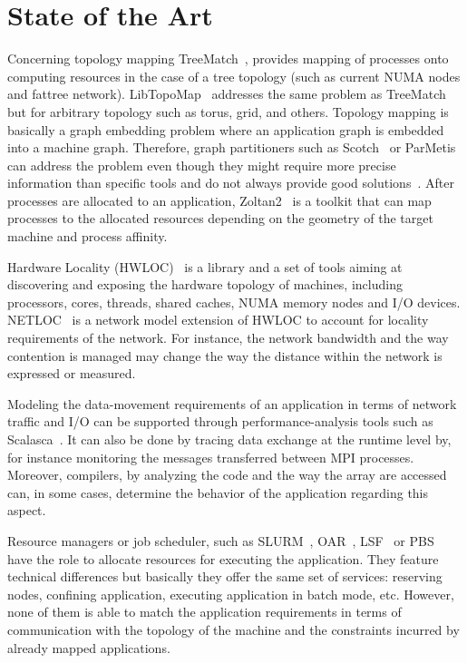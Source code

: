 \section{State of the Art}
Concerning topology mapping TreeMatch~\cite{jmt14b}, provides mapping
of processes onto computing resources in the case of a tree topology (such as
current NUMA nodes and fattree
network). LibTopoMap~\cite{DBLP:conf/ics/HoeflerS11} addresses the same problem as
TreeMatch but for arbitrary topology such as torus, grid, and others. Topology mapping is basically a graph embedding problem 
where an application graph is embedded into a machine graph.  Therefore, graph partitioners 
such as Scotch~\cite{scotch-man} or ParMetis~\cite{karypis2003parmetis} can address the
problem even though they might require more precise information than specific
tools and do not always provide good solutions~\cite{jmt14b}.  
After processes are allocated to an application, Zoltan2~\cite{zoltan2,drl+14} is a 
toolkit that can map processes to the allocated resources depending on the geometry of the 
target machine and process affinity.


Hardware Locality (HWLOC)~\cite{hwloc} is a library and a set of tools aiming at
discovering and exposing the hardware topology of machines, including
processors, cores, threads, shared caches, NUMA memory nodes and I/O devices.
NETLOC~\cite{netloc} is a network model extension of HWLOC to account for locality
requirements of the network. For instance, the network bandwidth and the way
contention is managed may change the way the distance within the network is
expressed or measured. 

Modeling the data-movement requirements of an application in terms of
network traffic and I/O can be supported through performance-analysis tools
such as Scalasca~\cite{geimer_ea:2010:scalascaarchitecture}. It can also be done
by tracing data exchange at the runtime level by, for instance monitoring the
messages transferred between MPI processes. Moreover, compilers, by analyzing
the code and the way the array are accessed can, in some cases, determine the
behavior of the application regarding this aspect. 

Resource managers or job scheduler, such as SLURM~\cite{yoo2003slurm},
OAR~\cite{capit2005batch,}, LSF~\cite{zhou1992lsf}
or PBS~\cite{henderson1995job} have the role to allocate resources for executing the
application. They feature technical differences but basically they offer the
same set of services: reserving nodes, confining application, executing
application in batch mode, etc. However, none of them is able to match the
application requirements in terms of communication with the topology of the
machine and the constraints incurred by already mapped applications. 


